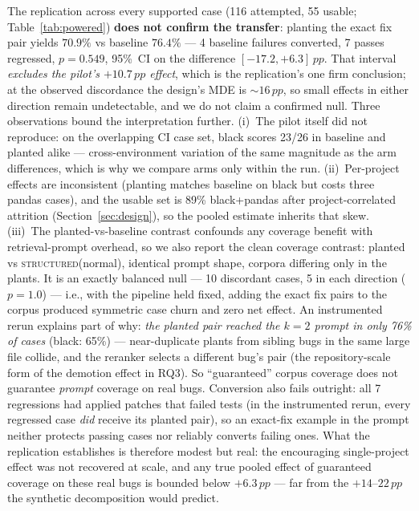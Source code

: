 \documentclass[10pt,conference,a4paper]{IEEEtran}
\newcommand{\structured}{\textsc{structured}\xspace}
\newcommand{\pp}{\,pp}
\begin{document}
The replication across every supported case (116 attempted, 55 usable;
Table~\ref{tab:powered}) \textbf{does not confirm the transfer}: planting
the exact fix pair yields $70.9\%$ vs baseline $76.4\%$ --- 4 baseline
failures converted, 7 passes regressed, $p{=}0.549$, 95\%~CI on the
difference $[-17.2, +6.3]\pp$. That interval \emph{excludes the pilot's
$+10.7\pp$ effect}, which is the replication's one firm conclusion; at the
observed discordance the design's MDE is ${\sim}16\pp$, so small effects in
either direction remain undetectable, and we do not claim a confirmed
null. Three observations bound the interpretation further. (i)~The pilot
itself did not reproduce: on the overlapping CI case set, black scores
23/26 in baseline and planted alike --- cross-environment variation of the
same magnitude as the arm differences, which is why we compare arms only
within the run. (ii)~Per-project effects are inconsistent (planting
matches baseline on black but costs three pandas cases), and the usable
set is 89\% black+pandas after project-correlated attrition
(Section~\ref{sec:design}), so the pooled estimate inherits that skew.
(iii)~The planted-vs-baseline contrast confounds any coverage benefit with
retrieval-prompt overhead, so we also report the clean coverage contrast:
planted vs \structured(normal), identical prompt shape, corpora differing
only in the plants. It is an exactly balanced null --- 10 discordant cases,
5 in each direction ($p{=}1.0$) --- i.e., with the pipeline held fixed,
adding the exact fix pairs to the corpus produced symmetric case churn and
zero net effect. An instrumented rerun explains part of why: \emph{the
planted pair reached the $k{=}2$ prompt in only 76\% of cases} (black:
65\%) --- near-duplicate plants from sibling bugs in the same large file
collide, and the reranker selects a different bug's pair (the
repository-scale form of the demotion effect in RQ3). So ``guaranteed''
corpus coverage does not guarantee \emph{prompt} coverage on real bugs.
Conversion also fails outright: all 7 regressions had applied patches that
failed tests (in the instrumented rerun, every regressed case \emph{did}
receive its planted pair), so an exact-fix example in the prompt neither
protects passing cases nor reliably converts failing ones. What the replication establishes is therefore modest but real:
the encouraging single-project effect was not recovered at scale, and any
true pooled effect of guaranteed coverage on these real bugs is bounded
below $+6.3\pp$ --- far from the $+14$--$22\pp$ the synthetic
decomposition would predict.
\end{document}
